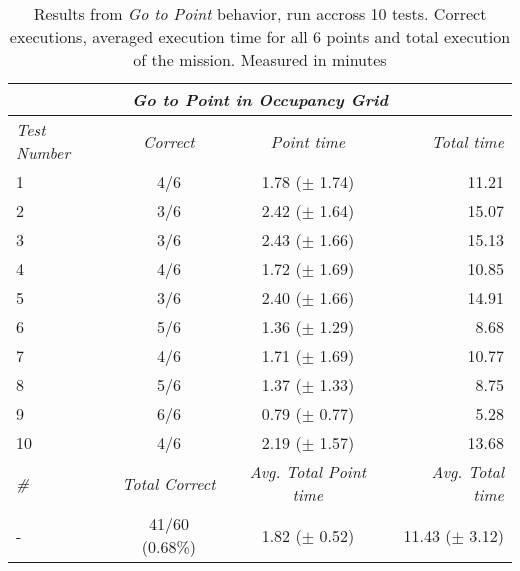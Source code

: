 \begin{table}[!h]
  \centering
  \begin{tabular}{lccr} \toprule
    \multicolumn{4}{c}{\textit{Go to Point in Occupancy Grid}}                        \\ \midrule
    \textit{Test Number} & \textit{Correct} & \textit{Point time} & \textit{Total time} \\ \midrule
      1 & 4/6 & 1.78 ($\pm$ 1.74) & 11.21 \\ \hline
      2 & 3/6 & 2.42 ($\pm$ 1.64) & 15.07 \\ \hline
      3 & 3/6 & 2.43 ($\pm$ 1.66) & 15.13 \\ \hline
      4 & 4/6 & 1.72 ($\pm$ 1.69) & 10.85 \\ \hline
      5 & 3/6 & 2.40 ($\pm$ 1.66) & 14.91 \\ \hline
      6 & 5/6 & 1.36 ($\pm$ 1.29) & 8.68 \\ \hline
      7 & 4/6 & 1.71 ($\pm$ 1.69) & 10.77 \\ \hline
      8 & 5/6 & 1.37 ($\pm$ 1.33) & 8.75 \\ \hline
      9 & 6/6 & 0.79 ($\pm$ 0.77) & 5.28 \\ \hline
      10 & 4/6 & 2.19 ($\pm$ 1.57) & 13.68 \\ \hline
      \textit{\#} & \textit{Total Correct} & \textit{Avg. Total Point time} & \textit{Avg. Total time} \\ \midrule
      - & 41/60 (0.68\%) & 1.82 ($\pm$ 0.52) & 11.43 ($\pm$ 3.12) \\ \bottomrule
      \hline
  \end{tabular}
  \caption{Results from \textit{Go to Point} behavior, run accross 10 tests. Correct executions, averaged execution time for all 6 points and total execution of the mission. Measured in minutes}
  \label{ch_5:table:go_to_point_results}
\end{table}
